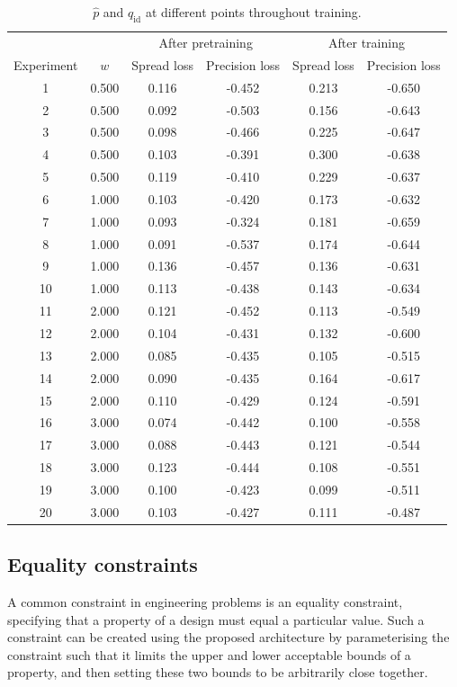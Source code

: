 \documentclass[../../main.tex]{subfiles}
\begin{document}
\begin{table}[H]
    \centering
    \begin{tabular}{*6c}
    \toprule
    {} & {} & \multicolumn{2}{c}{After pretraining} & \multicolumn{2}{c}{After training}\\
    Experiment&$w$&Spread loss&Precision loss&Spread loss&Precision loss\\
    \midrule
    1&0.500&0.116&-0.452&0.213&-0.650\\2&0.500&0.092&-0.503&0.156&-0.643\\3&0.500&0.098&-0.466&0.225&-0.647\\4&0.500&0.103&-0.391&0.300&-0.638\\5&0.500&0.119&-0.410&0.229&-0.637\\6&1.000&0.103&-0.420&0.173&-0.632\\7&1.000&0.093&-0.324&0.181&-0.659\\8&1.000&0.091&-0.537&0.174&-0.644\\9&1.000&0.136&-0.457&0.136&-0.631\\10&1.000&0.113&-0.438&0.143&-0.634\\11&2.000&0.121&-0.452&0.113&-0.549\\12&2.000&0.104&-0.431&0.132&-0.600\\13&2.000&0.085&-0.435&0.105&-0.515\\14&2.000&0.090&-0.435&0.164&-0.617\\15&2.000&0.110&-0.429&0.124&-0.591\\16&3.000&0.074&-0.442&0.100&-0.558\\
    17&3.000&0.088&-0.443&0.121&-0.544\\18&3.000&0.123&-0.444&0.108&-0.551\\19&3.000&0.100&-0.423&0.099&-0.511\\20&3.000&0.103&-0.427&0.111&-0.487\\
    \bottomrule
    \end{tabular}
    \caption{$\hat{p}$ and $q_\text{id}$ at different points throughout training.}
    \label{table:generatorTrainingProgression}
\end{table}

\subsection{Equality constraints} \label{subsection:equalityConstraints}

A common constraint in engineering problems is an equality constraint, specifying that a property of a design must equal a particular value.
Such a constraint can be created using the proposed architecture by parameterising the constraint such that it limits the upper and lower acceptable bounds of a property, and then setting these two bounds to be arbitrarily close together.
\end{document}
